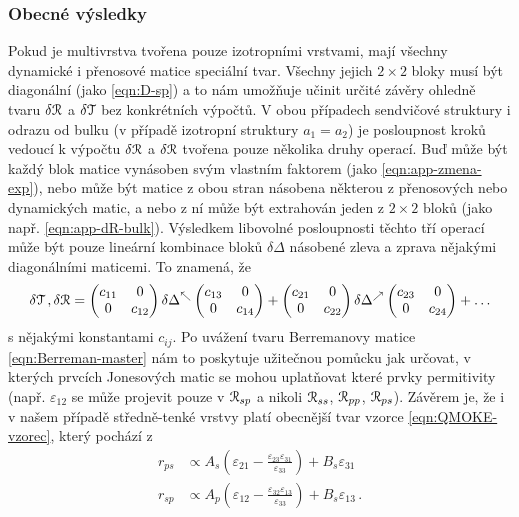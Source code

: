 \subsubsection*{Obecné výsledky}

Pokud je multivrstva tvořena pouze izotropními vrstvami, mají všechny dynamické i přenosové matice speciální tvar.
Všechny jejich $2\times2$ bloky musí být diagonální (jako \eqref{eqn:D-sp}) a to nám umožňuje učinit určité závěry ohledně tvaru $\delta\mathcal{R}$ a $\delta\mathcal{T}$ bez konkrétních výpočtů.
V obou případech sendvičové struktury i odrazu od bulku (v případě izotropní struktury $a_1=a_2$) je posloupnost kroků vedoucí k výpočtu $\delta\mathcal{R}$ a $\delta\mathcal{R}$ tvořena pouze několika druhy operací.
Buď může být každý blok matice vynásoben svým vlastním faktorem (jako \eqref{eqn:app-zmena-exp}), nebo může být matice z obou stran násobena některou z přenosových nebo dynamických matic, a nebo z ní může být extrahován jeden z $2\times2$ bloků (jako např. \eqref{eqn:app-dR-bulk}).
Výsledkem libovolné posloupnosti těchto tří operací může být pouze lineární kombinace bloků $\delta\Delta$ násobené zleva a zprava nějakými diagonálními maticemi.
To znamená, že
\begin{equation}
    \label{eqn:app-ktere-cleny}
    \begin{split}
        \delta\mathcal{T} \,, \delta\mathcal{R} = \begin{pmatrix} c_{11}&0\\0&c_{12} \end{pmatrix} \delta\Delta^\nwarrow \begin{pmatrix} c_{13}&0\\0&c_{14} \end{pmatrix} 
 +\begin{pmatrix} c_{21}&0\\0&c_{22} \end{pmatrix} \delta\Delta^\nearrow \begin{pmatrix} c_{23}&0\\0&c_{24} \end{pmatrix} + \ldots
\end{split}
\end{equation}
s nějakými konstantami $c_{ij}$.
Po uvážení tvaru Berremanovy matice \eqref{eqn:Berreman-master} nám to poskytuje užitečnou pomůcku jak určovat, v kterých prvcích Jonesových matic se mohou uplatňovat které prvky permitivity (např. $\varepsilon_{12}$ se může projevit pouze v $\mathcal{R}_{sp}$ a nikoli $\mathcal{R}_{ss}$, $\mathcal{R}_{pp}$, $\mathcal{R}_{ps}$).
Závěrem je, že i v našem případě středně-tenké vrstvy platí obecnější tvar vzorce \eqref{eqn:QMOKE-vzorec}, který pochází z \cite{hamrleVicinalInterfaceSensitive2003}
\begin{align}
    r_{ps} &\propto A_s \left( \varepsilon_{21} - \frac{\varepsilon_{23}\varepsilon_{31}}{\varepsilon_{33}}\right) + B_s \varepsilon_{31} \\
r_{sp} &\propto A_p \left( \varepsilon_{12} - \frac{\varepsilon_{32}\varepsilon_{13}}{\varepsilon_{33}}\right) + B_s \varepsilon_{13} \,.
\end{align}


